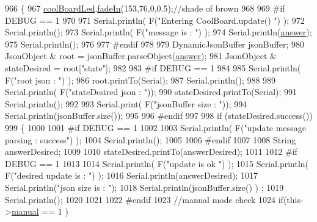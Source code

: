 \begin{DoxyCode}
966 \{
967     \hyperlink{class_cool_board_a1b1d3c684a5baa56b08486e192fd8e97}{coolBoardLed}.\hyperlink{class_cool_board_led_ab778f5e7bed0ab74e3906d82110493c3}{fadeIn}(153,76,0,0.5);\textcolor{comment}{//shade of brown        }
968 
969 \textcolor{preprocessor}{#if DEBUG == 1}
970 
971     Serial.println( F(\textcolor{stringliteral}{"Entering CoolBoard.update() "}) );
972     Serial.println();
973     Serial.println( F(\textcolor{stringliteral}{"message is : "}) );
974     Serial.println(\hyperlink{class_cool_board_a7b835fafd449e5282f7f91d787a2dc15}{answer});
975     Serial.println();
976 
977 \textcolor{preprocessor}{#endif}
978 
979     DynamicJsonBuffer jsonBuffer;
980     JsonObject & root = jsonBuffer.parseObject(\hyperlink{class_cool_board_a7b835fafd449e5282f7f91d787a2dc15}{answer});
981     JsonObject & stateDesired = root[\textcolor{stringliteral}{"state"}];
982 
983 \textcolor{preprocessor}{#if DEBUG == 1}
984 
985     Serial.println( F(\textcolor{stringliteral}{"root json : "}) );
986     root.printTo(Serial);
987     Serial.println();
988 
989     Serial.println( F(\textcolor{stringliteral}{"stateDesired json : "}));
990     stateDesired.printTo(Serial);
991     Serial.println();
992     
993     Serial.print( F(\textcolor{stringliteral}{"jsonBuffer size : "}));
994     Serial.println(jsonBuffer.size());
995 
996 \textcolor{preprocessor}{#endif}
997 
998     \textcolor{keywordflow}{if} (stateDesired.success())
999     \{
1000     
1001 \textcolor{preprocessor}{    #if DEBUG == 1}
1002 
1003         Serial.println( F(\textcolor{stringliteral}{"update message parsing : success"}) );
1004         Serial.println();
1005     
1006 \textcolor{preprocessor}{    #endif}
1007 
1008             String answerDesired;
1009         
1010             stateDesired.printTo(answerDesired);
1011             
1012 \textcolor{preprocessor}{        #if DEBUG == 1      }
1013         
1014             Serial.println( F(\textcolor{stringliteral}{"update is ok "}) );
1015             Serial.println( F(\textcolor{stringliteral}{"desired update is : "}) );            
1016             Serial.println(answerDesired);
1017             Serial.println(\textcolor{stringliteral}{"json size is : "});
1018             Serial.println(jsonBuffer.size() ) ;                
1019             Serial.println();
1020 
1021         
1022 \textcolor{preprocessor}{        #endif}
1023             \textcolor{comment}{//manual mode check}
1024             \textcolor{keywordflow}{if}(this->\hyperlink{class_cool_board_a7c8e505a5804b109e112d5a03df6ea2b}{manual} == 1 )

\end{DoxyCode}
